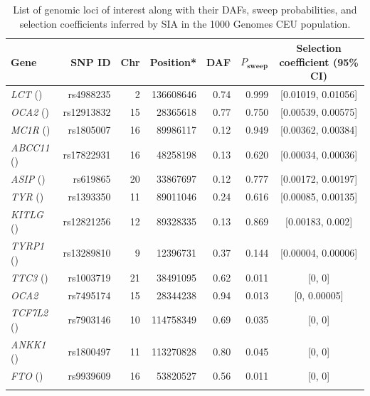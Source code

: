 \begin{table}
    
    \centering
    \caption{List of genomic loci of interest along with their \acfp{DAF}, sweep probabilities, and selection coefficients inferred by \ac{SIA} in the 1000 Genomes CEU population.}
    \vspace{5mm}
    \begin{tabular}{m{6cm} r r r r r c}
        \hline
        \textbf{Gene} & \textbf{\acs{SNP} ID} & \textbf{Chr} & \textbf{Position}* & \textbf{\ac{DAF}} & $P_{\mathrm{\textbf{sweep}}}$ & \textbf{Selection coefficient (95\% CI)} \\
        \hline
        \textit{LCT} (\cite{bersaglieri_genetic_2004}) & rs4988235 & 2 & 136608646 & 0.74 & 0.999 & [0.01019, 0.01056] \\
        \textit{OCA2} (\cite{han_genome-wide_2008,sturm_single_2008}) & rs12913832 & 15 & 28365618 & 0.77 & 0.750 & [0.00539, 0.00575] \\
        \textit{MC1R} (\cite{sulem_genetic_2007,han_genome-wide_2008}) & rs1805007 & 16 & 89986117 & 0.12 & 0.949 & [0.00362, 0.00384] \\
        \textit{ABCC11} (\cite{yoshiura_snp_2006}) & rs17822931 & 16 & 48258198 & 0.13 & 0.620 & [0.00034, 0.00036] \\
        \textit{ASIP} (\cite{eriksson_web-based_2010}) & rs619865 & 20 & 33867697 & 0.12 & 0.777 & [0.00172, 0.00197] \\
        \textit{TYR} (\cite{sulem_genetic_2007,eriksson_web-based_2010}) & rs1393350 & 11 & 89011046 & 0.24 & 0.616 & [0.00085, 0.00135] \\
        \textit{KITLG} (\cite{sulem_genetic_2007}) & rs12821256 & 12 & 89328335 & 0.13 & 0.869 & [0.00183, 0.002] \\
        \textit{TYRP1} (\cite{kenny_melanesian_2012}) & rs13289810 & 9 & 12396731 & 0.37 & 0.144 & [0.00004, 0.00006] \\
        \textit{TTC3} (\cite{liu_digital_2010}) & rs1003719 & 21 & 38491095 & 0.62 & 0.011 & [0, 0] \\
        \textit{OCA2} & rs7495174 & 15 & 28344238 & 0.94 & 0.013 & [0, 0.00005] \\
        \textit{TCF7L2} (\cite{lyssenko_mechanisms_2007}) & rs7903146 & 10 & 114758349 & 0.69 & 0.035 & [0, 0] \\
        \textit{ANKK1} (\cite{spellicy_variant_2014}) & rs1800497 & 11 & 113270828 & 0.80 & 0.045 & [0, 0] \\
        \textit{FTO} (\cite{frayling_common_2007}) & rs9939609 & 16 & 53820527 & 0.56 & 0.011 & [0, 0] \\
        \hline
        \rowcolor{white} \multicolumn{7}{l}{*Genomic coordinates in GRCh37 (hg19) assembly}
    \end{tabular}
    \label{tab:SIA-T1}
\end{table}

